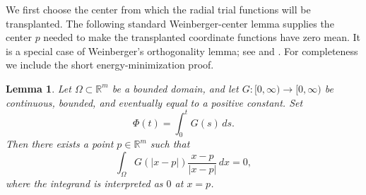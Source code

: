 \documentclass[11pt,letterpaper,reqno]{amsart}
\newtheorem{lemma}[theorem]{Lemma}
\theoremstyle{definition}
\newcommand{\R}{\mathbb R}
\begin{document}
We first choose the center from which the radial trial functions will be
transplanted. The following standard Weinberger-center lemma supplies the
center \(p\) needed to make the transplanted coordinate functions have
zero mean. It is a special case of Weinberger's orthogonality lemma; see
\cite[p.~635]{Wei56} and \cite[Corollary~2]{Lau20}. For completeness we
include the short energy-minimization proof.

\begin{lemma}\label{lem:weinberger-center}
Let \(\Omega\subset\R^m\) be a bounded domain, and let \(G:[0,\infty)\to[0,\infty)\) be continuous, bounded, and eventually equal to a positive constant. Set
\[
        \Phi(t)=\int_0^t G(s)\,ds .
\]
Then there exists a point \(p\in\R^m\) such that
\begin{equation}\label{eq:weinberger-center}
        \int_\Omega G(|x-p|)\frac{x-p}{|x-p|}\,dx=0,
\end{equation}
where the integrand is interpreted as \(0\) at \(x=p\).
\end{lemma}
\end{document}
